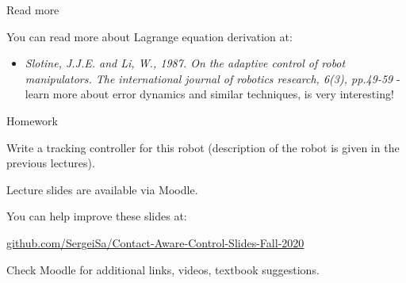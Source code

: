 \documentclass{beamer}
\begin{document}
\begin{frame}{Read more}
\begin{flushleft}

You can read more about Lagrange equation derivation at:

\begin{itemize}
    \item \emph{Slotine, J.J.E. and Li, W., 1987. On the adaptive control of robot manipulators. The international journal of robotics research, 6(3), pp.49-59} - learn more about error dynamics and similar techniques, is very interesting!
\end{itemize}

\end{flushleft}
\end{frame}


\begin{frame}{Homework}
\begin{flushleft}

Write a tracking controller for this robot (description of the robot is given in the previous lectures).

\begin{figure}
    \centering
    
\end{figure}

\end{flushleft}
\end{frame}



\begin{frame}
\centerline{Lecture slides are available via Moodle.}
\bigskip
\centerline{You can help improve these slides at:}
\centerline{\href{https://github.com/SergeiSa/Contact-Aware-Control-Slides-Fall-2020}{github.com/SergeiSa/Contact-Aware-Control-Slides-Fall-2020}}
\bigskip
\centerline{Check Moodle for additional links, videos, textbook suggestions.}
\end{frame}
\end{document}
